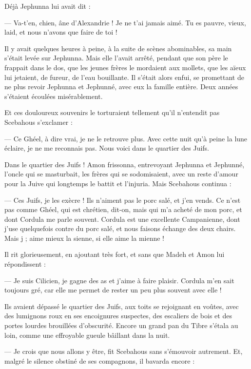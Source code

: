 \documentclass[a4paper, 11pt, oneside, polutonikogreek, french]{article}
\begin{document}
Déjà Jephunna lui avait dit :

--- Va-t'en, chien, âne d’Alexandrie ! Je ne t'ai jamais aimé. Tu es pauvre, vieux, laid, et nous n'avons que faire de toi !

Il y avait quelques heures à peine, à la suite de scènes abominables, sa main s'était levée sur Jephunna. Mais elle l'avait arrêté, pendant que son père le frappait dans le dos, que les jeunes frères le mordaient aux mollets, que les aïeux lui jetaient, de fureur, de l'eau bouillante. Il s'était alors enfui, se promettant de ne plus revoir Jephunna et Jephunné, avec eux la famille entière. Deux années s'étaient écoulées misérablement.

Et ces douloureux souvenirs le torturaient tellement qu'il n'entendit pas Scebahous s'exclamer :

--- Ce Ghéel, à dire vrai, je ne le retrouve plus. Avec cette nuit qu'à peine la lune éclaire, je ne me reconnais pas. Nous voici dans le quartier des Juifs.

Dans le quartier des Juifs ! Amon frissonna, entrevoyant Jephunna et Jephunné, l'oncle qui se masturbait, les frères qui se sodomisaient, avec un reste d'amour pour la Juive qui longtemps le battit et l'injuria. Mais Scebahous continua :

--- Ces Juifs, je les exècre ! Ils n'aiment pas le porc salé, et j'en vends. Ce n'est pas comme Ghéel, qui est chrétien, dit-on, mais qui m'a acheté de mon porc, et dont Cordula me parle souvent. Cordula est une excellente Campanienne, dont j'use quelquefois contre du porc salé, et nous faisons échange des deux chairs. Mais j ; aime mieux la sienne, si elle aime la mienne !

Il rit glorieusement, en ajoutant très fort, et sans que Madeh et Amon lui répondissent :

--- Je suis Cilicien, je gagne des as et j'aime à faire plaisir. Cordula m'en sait toujours gré, car elle me permet de rester un peu plus souvent avec elle !

Ils avaient dépassé le quartier des Juifs, aux toits se rejoignant en voûtes, avec des lumignons roux en ses encoignures suspectes, des escaliers de bois et des portes lourdes brouillées d'obscurité. Encore un grand pan du Tibre s'étala au loin, comme une effroyable gueule bâillant dans la nuit.

--- Je crois que nous allons y être, fit Scebahous sans s'émouvoir autrement. Et, malgré le silence obstiné de ses compagnons, il bavarda encore :
\end{document}
